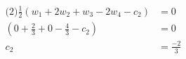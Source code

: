 \documentclass[12pt,a4paper]{article}
\begin{document}
\begin{enumerate}
\begin{align*}
		\text{(2)} \frac{1}{2}(w_1 + 2w_2 + w_3 - 2w_4 - c_2) &= 0\\
					(0 + \frac{2}{3} + 0  - \frac{4}{3} - c_2) &= 0\\
					c_2 &= \frac{-2}{3}
\end{align*}
\end{enumerate}
\end{document}
